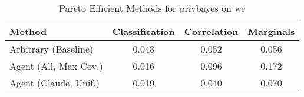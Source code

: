 \begin{table}[t!]
    \centering
    \caption{Pareto Efficient Methods for privbayes on we}
    \label{tab:pareto_efficient_methods_privbayes_we}
    \begin{tabular}{lccc}
    \toprule
    Method & Classification & Correlation & Marginals \\
    \midrule
    Arbitrary (Baseline) & \cellcolor{bronze!30}0.043 & \cellcolor{silver!30}0.052 & \cellcolor{gold!30}0.056 \\
    Agent (All, Max Cov.) & \cellcolor{gold!30}0.016 & \cellcolor{bronze!30}0.096 & \cellcolor{bronze!30}0.172 \\
    Agent (Claude, Unif.) & \cellcolor{silver!30}0.019 & \cellcolor{gold!30}0.040 & \cellcolor{silver!30}0.070 \\
    \bottomrule
    \end{tabular}
\end{table}